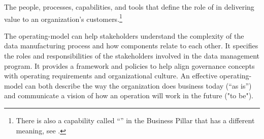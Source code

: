 %
%
The people, processes, capabilities, and tools that define the role of  in delivering
value to an organization’s customers.\footnote{%
    There is also a capability called ``'' in the
    Business Pillar that has a different meaning, see .
}

The \gls{operating-model} can help stakeholders understand the complexity of the data manufacturing process and how
components relate to each other.
It specifies the roles and responsibilities of the stakeholders involved in the data management program.
It provides a framework and policies to help align governance concepts with operating requirements and
organizational culture.
An effective \gls{operating-model} can both describe the way the organization does business today (“as is”) and
communicate a vision of how an operation will work in the future ("to be").

